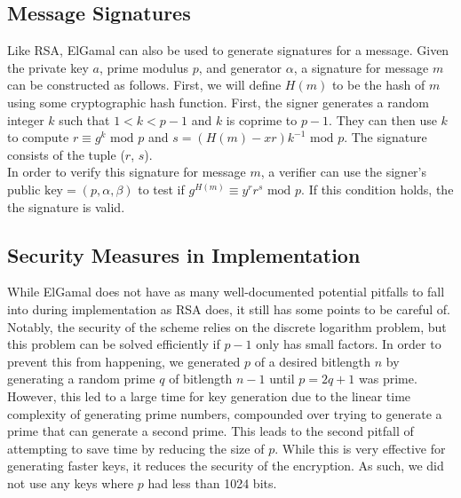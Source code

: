 	\subsection{Message Signatures}\label{sec:elgamal-sign}
		Like RSA, ElGamal can also be used to generate signatures for a message. Given the private key $a$, prime modulus $p$, and generator $\alpha$, a signature for message $m$ can be constructed
		as follows. First, we will define $H(m)$ to be the hash of $m$ using some cryptographic hash function. First, the signer generates a random integer $k$ such that $1<k<p-1$ and
		$k$ is coprime to $p-1$. They can then use $k$ to compute $r\equiv g^k\text{ mod }p$ and $s=(H(m)-xr)k^{-1}\text{ mod }p$. The signature consists of the tuple ($r$, $s$).\\

		In order to verify this signature for message $m$, a verifier can use the signer's $\text{public key}=(p, \alpha, \beta)$ to test if $g^{H(m)}\equiv y^rr^s\text{ mod }p$. If this condition
		holds, the the signature is valid.

	\subsection{Security Measures in Implementation}\label{sec:elgamal-security}
		While ElGamal does not have as many well-documented potential pitfalls to fall into during implementation as RSA does, it still has some points to be careful of. Notably, the security of the
		scheme relies on the discrete logarithm problem, but this problem can be solved efficiently if $p-1$ only has small factors. In order to prevent this from happening, we generated $p$ of a
		desired bitlength $n$ by generating a random prime $q$ of bitlength $n-1$ until $p=2q+1$ was prime. However, this led to a large time for key generation due to the linear time complexity
		of generating prime numbers, compounded over trying to generate a prime that can generate a second prime. This leads to the second pitfall of attempting to save time by reducing the
		size of $p$. While this is very effective for generating faster keys, it reduces the security of the encryption. As such, we did not use any keys where $p$ had less than 1024 bits.

